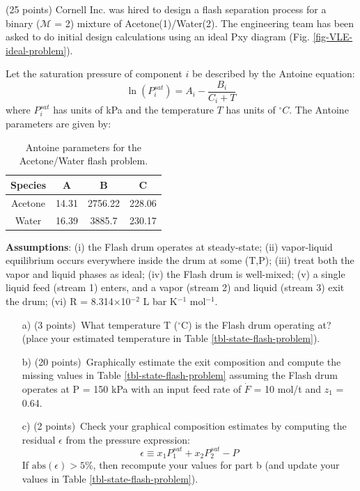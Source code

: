     \item{(25 points) Cornell Inc. was hired to design a flash separation process for a binary ($\mathcal{M}$ = 2) mixture of Acetone(1)/Water(2). 
    The engineering team has been asked to do initial design calculations using an ideal Pxy diagram (Fig. \ref{fig-VLE-ideal-problem}). 
    
    Let the saturation pressure of component $i$ be described by the Antoine equation:
    \begin{equation}
      \ln\left(P_{i}^{sat}\right) = A_{i} - \frac{B_{i}}{C_{i}+T}
    \end{equation}where $P_{i}^{sat}$ has units of kPa and the temperature $T$ has units of $^{\circ}C$.
    The Antoine parameters are given by:

    \begin{table}[!ht]
      \centering
      \caption{Antoine parameters for the Acetone/Water flash problem.}
      \setlength{\tabcolsep}{18pt}
      \begin{tabular}{c|c|c|c}\toprule
        Species & A & B & C \\ \toprule
        Acetone & 14.31 & 2756.22 & 228.06 \\
        Water & 16.39 & 3885.7 & 230.17 \\\bottomrule
      \end{tabular}
    \end{table}
         
    \textbf{Assumptions}: (i) the Flash drum operates at steady-state;
    (ii) vapor-liquid equilibrium occurs everywhere inside the drum at some (T,P);
    (iii) treat both the vapor and liquid phases as ideal;
    (iv) the Flash drum is well-mixed;
    (v) a single liquid feed (stream 1) enters, and a vapor (stream 2) and liquid (stream 3) exit the drum;
    (vi) R = 8.314$\times$10$^{-2}$ L bar K$^{-1}$ mol$^{-1}$.
    
    \begin{itemize}
      \item[a)]{(3 points)~What temperature T ($^{\circ}$C) is the Flash drum operating at? (place your estimated temperature in Table
      \ref{tbl-state-flash-problem}).}    
      \item[b)]{(20 points)~Graphically estimate the exit composition and compute the missing values in Table \ref{tbl-state-flash-problem} assuming the Flash drum operates at P = 150 kPa with an input feed rate of $\dot{F}$ = 10 mol/t and $z_{1}$ = 0.64.}
      \item[c)]{(2 points)~Check your graphical composition estimates by computing the residual $\epsilon$ from the pressure expression:
        \begin{equation}
          \epsilon \equiv x_{1}P_{1}^{sat}+x_{2}P_{2}^{sat} - P
        \end{equation}
      If $\text{abs}(\epsilon)>5\%$, then recompute your values for part b (and update your values in Table \ref{tbl-state-flash-problem}).}
    \end{itemize}
    
}
